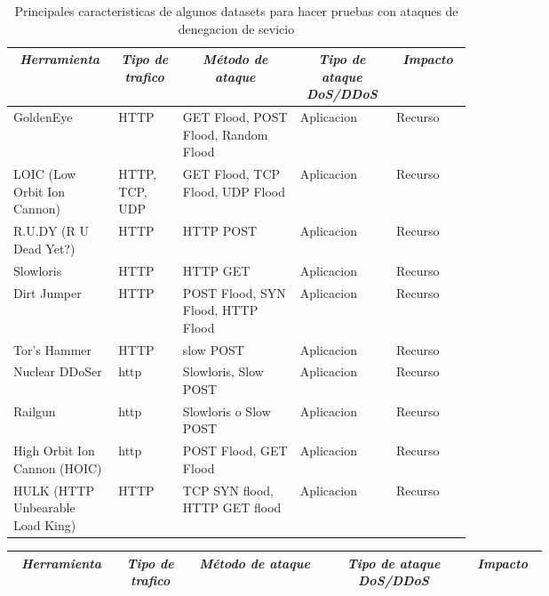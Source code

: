 \documentclass[12pt]{article}
\begin{document}
\begin{landscape}

\begin{table}[htbp]
\centering
\begin{tabular}{|p{0.1\linewidth}|p{0.1\linewidth}|p{0.2\linewidth}|p{0.1\linewidth}|p{0.1\linewidth}|}\hline
\multicolumn{1}{|c|}{\textit{\textbf{Herramienta}}} & 
\multicolumn{1}{c|}{\textit{\textbf{Tipo de trafico}}} &
\multicolumn{1}{|c|}{\textit{\textbf{Método de ataque}}} & 
\multicolumn{1}{|c|}{\textit{\textbf{Tipo de ataque DoS/DDoS}}} &
\multicolumn{1}{|c|}{\textit{\textbf{Impacto}}} \tabularnewline \hline

GoldenEye &
HTTP & 
GET Flood, POST Flood, Random Flood  & 
Aplicacion & 
Recurso
\tabularnewline \hline

LOIC (Low Orbit Ion Cannon) &
HTTP, TCP, UDP & 
GET Flood, TCP Flood, UDP Flood  & 
Aplicacion & 
Recurso
\tabularnewline \hline

R.U.DY (R U Dead Yet?) &
HTTP & 
HTTP POST  & 
Aplicacion & 
Recurso
\tabularnewline \hline

Slowloris &
HTTP & 
HTTP GET   & 
Aplicacion & 
Recurso
\tabularnewline \hline

Dirt Jumper &
HTTP & 
POST Flood, SYN Flood, HTTP Flood & 
Aplicacion & 
Recurso
\tabularnewline \hline

Tor’s Hammer &
HTTP & 
slow POST & 
Aplicacion & 
Recurso
\tabularnewline \hline

Nuclear DDoSer &
http & 
Slowloris, Slow POST & 
Aplicacion & 
Recurso
\tabularnewline \hline

Railgun &
http & 
Slowloris o Slow POST & 
Aplicacion & 
Recurso
\tabularnewline \hline

High Orbit Ion Cannon (HOIC) &
http & 
POST Flood, GET Flood & 
Aplicacion & 
Recurso
\tabularnewline \hline

HULK (HTTP Unbearable Load King) &
HTTP & 
TCP SYN flood, HTTP GET flood & 
Aplicacion & 
Recurso
\tabularnewline \hline

\end{tabular}
\caption{Principales caracteristicas de algunos datasets para hacer pruebas con ataques de denegacion de sevicio} \label{tab:sometab}
\end{table} 

\newpage

\begin{table}[htbp]
\centering
\begin{tabular}{|p{0.1\linewidth}|p{0.1\linewidth}|p{0.2\linewidth}|p{0.2\linewidth}|p{0.1\linewidth}|}\hline
\multicolumn{1}{|c|}{\textit{\textbf{Herramienta}}} & 
\multicolumn{1}{c|}{\textit{\textbf{Tipo de trafico}}} &
\multicolumn{1}{|c|}{\textit{\textbf{Método de ataque}}} & 
\multicolumn{1}{|c|}{\textit{\textbf{Tipo de ataque DoS/DDoS}}} &
\multicolumn{1}{|c|}{\textit{\textbf{Impacto}}} \tabularnewline \hline


\end{tabular}
\end{table}
\end{landscape}
\end{document}
